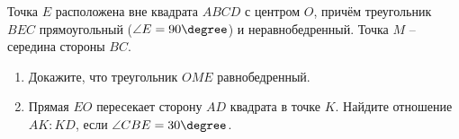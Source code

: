 \begin{ex}
	\begin{condition}
		Точка \( E  \) расположена вне квадрата \( ABCD  \) с центром \( O \), причём треугольник \( BEC  \) прямоугольный (\( \angle E = 90\degree \)) и неравнобедренный. Точка \( M \) – середина стороны \( BC \).
		\begin{enumerate}
			\item Докажите, что треугольник \( OME  \) равнобедренный.
			\item Прямая \( EO \) пересекает сторону \( AD  \) квадрата в точке \( K \). Найдите отношение \( AK : KD \), если \( \angle CBE=30\degree \).
		\end{enumerate}
	\end{condition}
\end{ex}